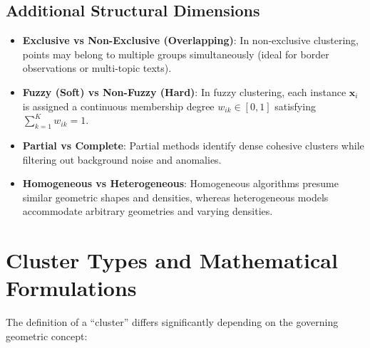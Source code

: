 \subsection{Additional Structural Dimensions}
\begin{itemize}
    \item \textbf{Exclusive vs Non-Exclusive (Overlapping)}: In non-exclusive clustering, points may belong to multiple groups simultaneously (ideal for border observations or multi-topic texts).
    \item \textbf{Fuzzy (Soft) vs Non-Fuzzy (Hard)}: In fuzzy clustering, each instance $\mathbf{x}_i$ is assigned a continuous membership degree $w_{ik} \in [0, 1]$ satisfying $\sum_{k=1}^K w_{ik} = 1$.
    \item \textbf{Partial vs Complete}: Partial methods identify dense cohesive clusters while filtering out background noise and anomalies.
    \item \textbf{Homogeneous vs Heterogeneous}: Homogeneous algorithms presume similar geometric shapes and densities, whereas heterogeneous models accommodate arbitrary geometries and varying densities.
\end{itemize}

\section{Cluster Types and Mathematical Formulations}
\label{sec:dm-cluster-types-definitions}

The definition of a ``cluster'' differs significantly depending on the governing geometric concept:

